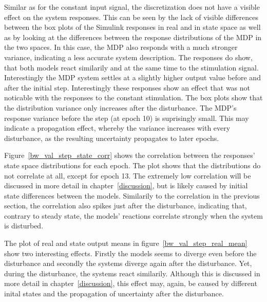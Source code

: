 Similar as for the constant input signal, the discretization does not have a visible effect on the system responses. This can be seen by the lack of visible differences between the box plots of the Simulink responses in real and in state space as well as by looking at the differences between the response distributions of the MDP in the two spaces. In this case, the MDP also responds with a much stronger variance, indicating a less accurate system description. The responses do show, that both models react similarily and at the same time to the stimulation signal. Interestingly the MDP system settles at a slightly higher output value before and after the initial step. Interestingly these responses show an effect that was not noticable with the responses to the constant stimulation. The box plots show that the distribution variance only increases after the disturbance. The MDP's response variance before the step (at epoch 10) is suprisingly small. This may indicate a propagation effect, whereby the variance increases with every disturbance, as the resulting uncertainty propagates to later epochs.

Figure~\ref{bw_val_step_state_corr} shows the correlation between the responses' state space distributions for each epoch. The plot shows that the distributions do not correlate at all, except for epoch 13. The extremely low correlation will be discussed in more detail in chapter~\ref{discussion}, but is likely caused by initial state differences between the models. Similarily to the correlation in the previous section, the correlation also spikes just after the disturbance, indicating that, contrary to steady state, the models' reactions correlate strongly when the system is disturbed.

The plot of real and state output means in figure~\ref{bw_val_step_real_mean} show two interesting effects. Firstly the models seems to diverge even before the disturbance and secondly the systems diverge again after the disturbance. Yet, during the disturbance, the systems react similarily. Although this is discussed in more detail in chapter~\ref{discussion}, this effect may, again, be caused by different inital states and the propagation of uncertainty after the disturbance.









